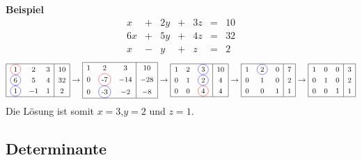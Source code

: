 \textbf{Beispiel}
\begin{equation*}
	\begin{array}{rcrcrcr}
		 x &+& 2y &+& 3z &=& 10\\
		6x &+& 5y &+& 4z &=& 32\\
		 x &-&  y &+&  z &=& 2
	\end{array}
\end{equation*}
\begin{equation*}
\small
\renewcommand{\arraystretch}{1.25}
	\begin{array}{|ccc|c|}
		\hline
		\circledr{1}  &  2 & 3  & 10\\
		\circledb{6}  &  5 & 4  & 32\\
		\circledb{1}  & -1 & 1  & 2 \\
		\hline
	\end{array}
	\rightarrow
	\begin{array}{|ccc|c|}
		\hline
		1  & 2             & 3   & 10 \\
		0  & \circledr{-7} & -14 & -28\\
		0  & \circledb{-3} & -2  & -8 \\
		\hline
	\end{array}
	\rightarrow
	\begin{array}{|ccc|c|}
		\hline
		1  & 2  & \circledb{3} & 10\\
		0  & 1  & \circledb{2} & 4 \\
		0  & 0  & \circledr{4} & 4 \\
		\hline
	\end{array}
	\rightarrow
	\begin{array}{|ccc|c|}
		\hline
		1 & \circledb{2} & 0 & 7\\
		0 & 1            & 0 & 2 \\
		0 & 0            & 1 & 1 \\
		\hline
	\end{array}
	\rightarrow
	\begin{array}{|ccc|c|}
		\hline
		1 & 0 & 0 & 3\\
		0 & 1 & 0 & 2 \\
		0 & 0 & 1 & 1 \\
		\hline
	\end{array}
	\renewcommand{\arraystretch}{1}
\end{equation*}
Die Lösung ist somit $x = 3 $,$ y = 2 $ und $ z = 1$.
\subsection{Determinante}

